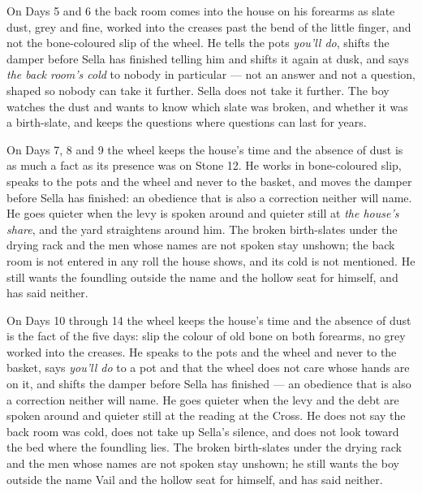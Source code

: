 \documentclass{design/chronicle}
\begin{document}
{On Days 5 and 6 the back room comes into the house on his forearms as slate dust, grey and fine, worked into the creases past the bend of the little finger, and not the bone-coloured slip of the wheel. He tells the pots \emph{you’ll do}, shifts the damper before Sella has finished telling him and shifts it again at dusk, and says \emph{the back room’s cold} to nobody in particular --- not an answer and not a question, shaped so nobody can take it further. Sella does not take it further. The boy watches the dust and wants to know which slate was broken, and whether it was a birth-slate, and keeps the questions where questions can last for years.

On Days 7, 8 and 9 the wheel keeps the house’s time and the absence of dust is as much a fact as its presence was on Stone 12. He works in bone-coloured slip, speaks to the pots and the wheel and never to the basket, and moves the damper before Sella has finished: an obedience that is also a correction neither will name. He goes quieter when the levy is spoken around and quieter still at \emph{the house’s share}, and the yard straightens around him. The broken birth-slates under the drying rack and the men whose names are not spoken stay unshown; the back room is not entered in any roll the house shows, and its cold is not mentioned. He still wants the foundling outside the name and the hollow seat for himself, and has said neither.

On Days 10 through 14 the wheel keeps the house’s time and the absence of dust is the fact of the five days: slip the colour of old bone on both forearms, no grey worked into the creases. He speaks to the pots and the wheel and never to the basket, says \emph{you’ll do} to a pot and that the wheel does not care whose hands are on it, and shifts the damper before Sella has finished --- an obedience that is also a correction neither will name. He goes quieter when the levy and the debt are spoken around and quieter still at the reading at the Cross. He does not say the back room was cold, does not take up Sella’s silence, and does not look toward the bed where the foundling lies. The broken birth-slates under the drying rack and the men whose names are not spoken stay unshown; he still wants the boy outside the name Vail and the hollow seat for himself, and has said neither.

}
\end{document}
